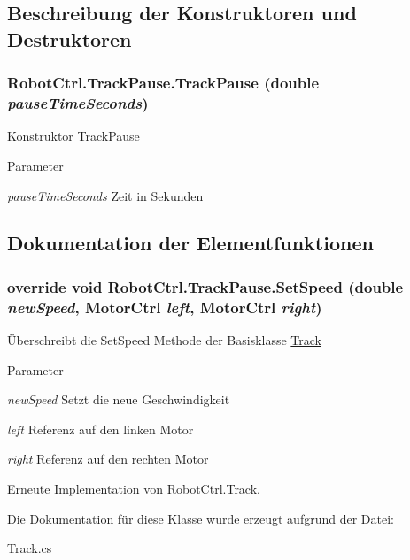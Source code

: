 \subsection{Beschreibung der Konstruktoren und Destruktoren}
\hypertarget{class_robot_ctrl_1_1_track_pause_ab869a1e5eb8a5db402ad7a7515700688}{
\subsubsection[{TrackPause}]{\setlength{\rightskip}{0pt plus 5cm}RobotCtrl.TrackPause.TrackPause (double {\em pauseTimeSeconds})}}
\label{class_robot_ctrl_1_1_track_pause_ab869a1e5eb8a5db402ad7a7515700688}
Konstruktor \hyperlink{class_robot_ctrl_1_1_track_pause}{TrackPause}


\begin{DoxyParams}{Parameter}
\item[{\em pauseTimeSeconds}]Zeit in Sekunden \end{DoxyParams}


\subsection{Dokumentation der Elementfunktionen}
\hypertarget{class_robot_ctrl_1_1_track_pause_a47133c69e455aa2c04f1bc3a6b5999b6}{
\subsubsection[{SetSpeed}]{\setlength{\rightskip}{0pt plus 5cm}override void RobotCtrl.TrackPause.SetSpeed (double {\em newSpeed}, \/  {\bf MotorCtrl} {\em left}, \/  {\bf MotorCtrl} {\em right})}}
\label{class_robot_ctrl_1_1_track_pause_a47133c69e455aa2c04f1bc3a6b5999b6}
\"{U}berschreibt die SetSpeed Methode der Basisklasse \hyperlink{class_robot_ctrl_1_1_track}{Track}


\begin{DoxyParams}{Parameter}
\item[{\em newSpeed}]Setzt die neue Geschwindigkeit \item[{\em left}]Referenz auf den linken Motor \item[{\em right}]Referenz auf den rechten Motor \end{DoxyParams}


Erneute Implementation von \hyperlink{class_robot_ctrl_1_1_track_a9abc3ccf4bf1d9db8d461f2cb4b4b0d3}{RobotCtrl.Track}.



Die Dokumentation für diese Klasse wurde erzeugt aufgrund der Datei:\begin{DoxyCompactItemize}
\item 
Track.cs\end{DoxyCompactItemize}
